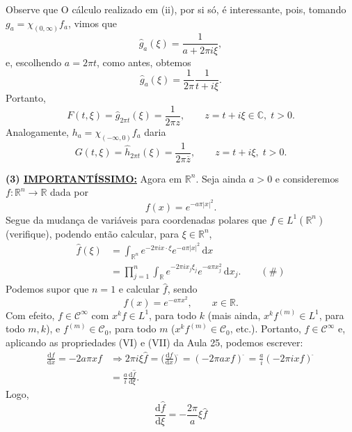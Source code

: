 \documentclass[../distribution_theory_notes.tex]{subfiles}
\begin{document}
\begin{example}
\begin{tcolorbox}
		Observe que O cálculo realizado em (ii), por si só, é interessante, pois, tomando \(g_{a}=\chi _{(0,\infty )}f_{a}\), vimos que
		\[
			\hat{g}_{a}(\xi )=\frac{1}{a+2\pi i\xi },
		\]
		e, escolhendo \(a=2\pi t\), como antes, obtemos
		\[
			\hat{g}_{a}(\xi )=\frac{1}{2\pi }\frac{1}{t+i\xi }.
		\]
		Portanto,
		\[
			F(t,\xi )=\hat{g}_{2\pi t}(\xi )=\frac{1}{2\pi z},\qquad z=t+i\xi \in \mathbb{C},\; t>0.
		\]
		Analogamente, \(h_{a}=\chi _{(-\infty ,0)}f_{a}\) daria
		\[
			G(t,\xi )=\hat{h}_{2\pi t}(\xi )=\frac{1}{2\pi \overline{z}},\qquad z=t+i\xi ,\; t>0.
		\]
	\end{tcolorbox}

\end{example}

\begin{example}
	\textbf{(3) \underline{IMPORTANTÍSSIMO:}} Agora em \(\mathbb{R}^{n}\). Seja ainda \(a>0\) e consideremos \(f:\mathbb{R}^{n}\rightarrow \mathbb{R}\) dada por
	\[
		f(x)=e^{-a\pi |x|^{2}}.
	\]
	Segue da mudança de variáveis para coordenadas polares que \(f\in L^{1}(\mathbb{R}^{n})\) (verifique), podendo então calcular, para \(\xi \in \mathbb{R}^{n}\),
	\begin{align*}
		\hat{f}(\xi )
		 & =\int_{\mathbb{R}^{n}}e^{-2\pi i x\cdot \xi }e^{-a\pi |x|^{2}}\,\mathrm{d}x                                 \\
		 & =\prod_{j=1}^{n}\int_{\mathbb{R}}e^{-2\pi i x_{j}\xi _{j}}e^{-a\pi x_{j}^{2}}\,\mathrm{d}x_{j}. \qquad (\#)
	\end{align*}
	Podemos supor que \(n=1\) e calcular \(\hat{f}\), sendo
	\[
		f(x)=e^{-a\pi x^{2}},\qquad x\in \mathbb{R}.
	\]
	Com efeito, \(f\in \mathcal{C}^{\infty}\) com \(x^{k}f\in L^{1}\), para todo \(k\) (mais ainda, \(x^{k}f^{(m)}\in L^{1}\), para todo \(m,k\)), e \(f^{(m)}\in \mathcal{C}_{0}\), para todo \(m\) (\(x^{k}f^{(m)}\in \mathcal{C}_{0}\), etc.). Portanto, \(\hat{f}\in \mathcal{C}^{\infty}\) e, aplicando as propriedades (VI) e (VII) da Aula 25, podemos escrever:
	\begin{align*}
		\frac{\mathrm{d}f}{\mathrm{d}x}=-2a\pi x f
		 & \Rightarrow 2\pi i\xi \hat{f}=\biggl(\frac{\mathrm{d}f}{\mathrm{d}x}\biggr)^{\widehat{\; }}
		=(-2\pi a x f)^{\widehat{\; }}
		=\frac{a}{i}(-2\pi i x f)^{\widehat{\; }}                                                      \\
		 & =\frac{a}{i}\frac{\mathrm{d}\hat{f}}{\mathrm{d}\xi }.
	\end{align*}
	Logo,
	\[
		\frac{\mathrm{d}\hat{f}}{\mathrm{d}\xi }=-\frac{2\pi }{a}\xi \hat{f}
\]
\end{example}
\end{document}
